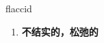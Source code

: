 
\begin{frame}
{\huge flaccid}
\begin{center}
\begin{enumerate}\Large
  \item \textbf{不结实的，松弛的}
\end{enumerate}
\end{center}
\end{frame}
